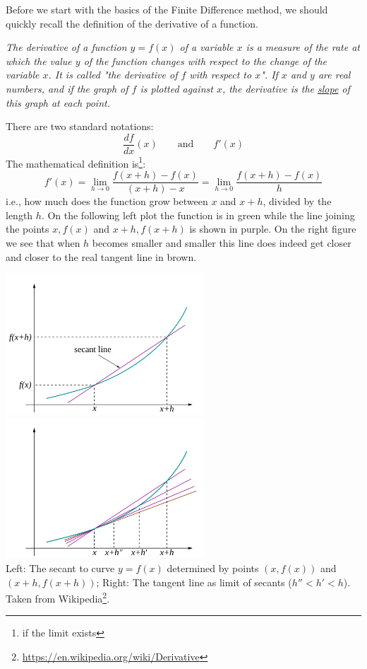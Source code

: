 Before we start with the basics of the Finite Difference method, we should quickly recall the definition 
of the derivative of a function. 

\begin{center}
{\sl 
The derivative of a function $y=f(x)$ of a variable $x$ is a measure of the rate at which the value $y$ 
of the function changes with respect to the change of the variable $x$. It is called "the derivative of $f$ 
with respect to $x$". If $x$ and $y$ are real numbers, and if the graph of $f$ is plotted against $x$, the derivative 
is the \underline{slope} of this graph at each point. 
}
\end{center}

\noindent There are two standard notations:
\begin{equation}
\frac{df}{dx}(x) \qquad \text{and} \qquad f'(x)
\end{equation}
The mathematical definition is\footnote{if the limit exists}:
\begin{equation}
\boxed{
f'(x)
=\lim_{h\rightarrow 0} \frac{f(x+h)-f(x)}{(x+h)-x} 
=\lim_{h\rightarrow 0} \frac{f(x+h)-f(x)}{h} 
}
\end{equation}
i.e., how much does the function grow between $x$ and $x+h$, divided by the length $h$.
On the following left plot the function is in green while the line joining the points
$x,f(x)$ and $x+h,f(x+h)$ is shown in purple. On the right figure we see that 
when $h$ becomes smaller and smaller this line does indeed get closer and closer 
to the real tangent line in brown.

\begin{center}
\includegraphics[width=7.4cm]{images/derivative/der2}
\includegraphics[width=7.4cm]{images/derivative/der1}\\
{\captionfont 
Left: The secant to curve $y=f(x)$ determined by points $(x,f(x))$ and $(x+h, f(x+h))$;
Right: The tangent line as limit of secants ($h''<h'<h$).
Taken from Wikipedia\footnote{\url{https://en.wikipedia.org/wiki/Derivative}}.
}
\end{center}

